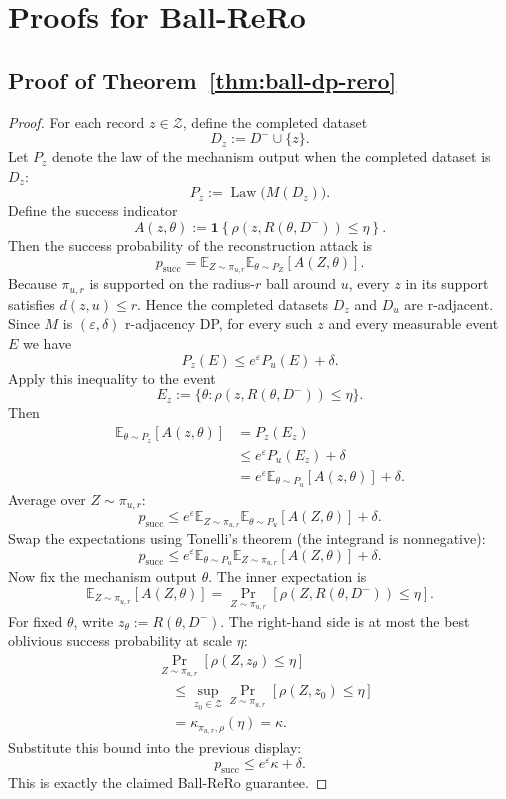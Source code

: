 \documentclass[conference,compsoc]{IEEEtran}
\DeclareMathOperator{\Law}{Law}
\newcommand{\ind}[1]{\mathbf{1}\!\left\{#1\right\}}
\begin{document}
\section{Proofs for Ball-ReRo}
\label{app:proof-ball-rero}

\subsection{Proof of Theorem~\ref{thm:ball-dp-rero}}

\begin{proof}
For each record $z\in\mathcal{Z}$, define the completed dataset
\[
D_z:=D^-\cup\{z\}.
\]
Let $P_z$ denote the law of the mechanism output when the completed dataset is $D_z$:
\[
P_z:=\Law\big(M(D_z)\big).
\]
Define the success indicator
\[
A(z,\theta):=\ind{\rho(z,R(\theta,D^-))\le \eta}.
\]
Then the success probability of the reconstruction attack is
\[
p_{\mathrm{succ}}
=
\mathbb{E}_{Z\sim\pi_{u,r}}
\mathbb{E}_{\theta\sim P_Z}[A(Z,\theta)].
\]
Because $\pi_{u,r}$ is supported on the radius-$r$ ball around $u$, every $z$ in its support satisfies $d(z,u)\le r$. Hence the completed datasets $D_z$ and $D_u$ are r-adjacent. Since $M$ is $(\varepsilon,\delta)$ r-adjacency DP, for every such $z$ and every measurable event $E$ we have
\[
P_z(E)\le e^{\varepsilon}P_u(E)+\delta.
\]
Apply this inequality to the event
\[
E_z:=\{\theta: \rho(z,R(\theta,D^-))\le \eta\}.
\]
Then
\[
\begin{aligned}
\mathbb{E}_{\theta\sim P_z}[A(z,\theta)]
&= P_z(E_z) \\
&\le e^{\varepsilon} P_u(E_z) + \delta \\
&= e^{\varepsilon}
   \mathbb{E}_{\theta\sim P_u}[A(z,\theta)]
   + \delta .
\end{aligned}
\]
Average over $Z\sim\pi_{u,r}$:
\[
p_{\mathrm{succ}}
\le
 e^{\varepsilon}
\mathbb{E}_{Z\sim\pi_{u,r}}
\mathbb{E}_{\theta\sim P_u}[A(Z,\theta)]
+\delta.
\]
Swap the expectations using Tonelli's theorem (the integrand is nonnegative):
\[
p_{\mathrm{succ}}
\le
 e^{\varepsilon}
\mathbb{E}_{\theta\sim P_u}
\mathbb{E}_{Z\sim\pi_{u,r}}[A(Z,\theta)]
+\delta.
\]
Now fix the mechanism output $\theta$. The inner expectation is
\[
\mathbb{E}_{Z\sim\pi_{u,r}}[A(Z,\theta)]
=
\Pr_{Z\sim\pi_{u,r}}[\rho(Z,R(\theta,D^-))\le \eta].
\]
For fixed $\theta$, write $z_\theta:=R(\theta,D^-)$. The right-hand
side is at most the best oblivious success probability at scale $\eta$:
\[
\begin{aligned}
&\Pr_{Z\sim\pi_{u,r}}
   [\rho(Z,z_\theta)\le \eta] \\
&\quad\le
\sup_{z_0\in\mathcal{Z}}
\Pr_{Z\sim\pi_{u,r}}[\rho(Z,z_0)\le \eta] \\
&\quad=
\kappa_{\pi_{u,r},\rho}(\eta)
=
\kappa.
\end{aligned}
\]
Substitute this bound into the previous display:
\[
p_{\mathrm{succ}}\le e^{\varepsilon}\kappa+\delta.
\]
This is exactly the claimed Ball-ReRo guarantee.
\end{proof}
\end{document}
